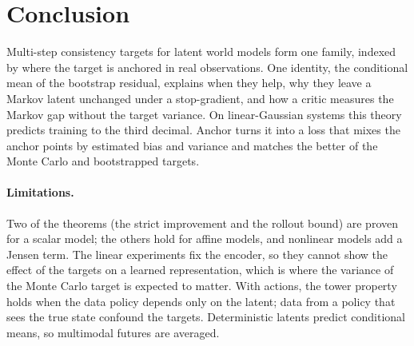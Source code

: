 \section{Conclusion}
\label{sec:conclusion}
Multi-step consistency targets for latent world models form one family, indexed by where the target is anchored in real observations. One identity, the conditional mean of the bootstrap residual, explains when they help, why they leave a Markov latent unchanged under a stop-gradient, and how a critic measures the Markov gap without the target variance. On linear-Gaussian systems this theory predicts training to the third decimal. Anchor turns it into a loss that mixes the anchor points by estimated bias and variance and matches the better of the Monte Carlo and bootstrapped targets. 

\paragraph{Limitations.}
Two of the theorems (the strict improvement and the rollout bound) are proven for a scalar model; the others hold for affine models, and nonlinear models add a Jensen term. The linear experiments fix the encoder, so they cannot show the effect of the targets on a learned representation, which is where the variance of the Monte Carlo target is expected to matter. With actions, the tower property holds when the data policy depends only on the latent; data from a policy that sees the true state confound the targets. Deterministic latents predict conditional means, so multimodal futures are averaged. 
